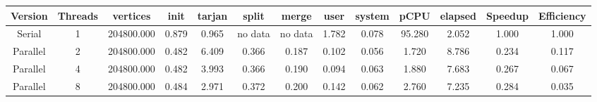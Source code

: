 \begin{tabular}{|c|c|c|c|c|c|c|c|c|c|c|c|c|}
\toprule
 Version &  Threads &   vertices &  init &  tarjan &   split &   merge &  user &  system &   pCPU &  elapsed &  Speedup &  Efficiency \\
\midrule
  Serial &        1 & 204800.000 & 0.879 &   0.965 & no data & no data & 1.782 &   0.078 & 95.280 &    2.052 &    1.000 &       1.000 \\
Parallel &        2 & 204800.000 & 0.482 &   6.409 &   0.366 &   0.187 & 0.102 &   0.056 &  1.720 &    8.786 &    0.234 &       0.117 \\
Parallel &        4 & 204800.000 & 0.482 &   3.993 &   0.366 &   0.190 & 0.094 &   0.063 &  1.880 &    7.683 &    0.267 &       0.067 \\
Parallel &        8 & 204800.000 & 0.484 &   2.971 &   0.372 &   0.200 & 0.142 &   0.062 &  2.760 &    7.235 &    0.284 &       0.035 \\
\bottomrule
\end{tabular}
